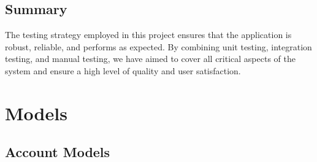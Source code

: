 \documentclass[letterpaper,10pt,english]{sphinxmanual}
\begin{document}
\section{Summary}
\label{\detokenize{modules/testing:summary}}
\sphinxAtStartPar
The testing strategy employed in this project ensures that the application is robust, reliable, and performs as expected. By combining unit testing, integration testing, and manual testing, we have aimed to cover all critical aspects of the system and ensure a high level of quality and user satisfaction.

\sphinxstepscope


\chapter{Models}
\label{\detokenize{modules/models:models}}\label{\detokenize{modules/models::doc}}

\section{Account Models}
\label{\detokenize{modules/models:module-account.models}}\label{\detokenize{modules/models:account-models}}
\end{document}
